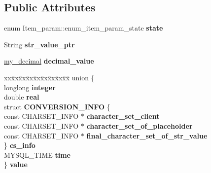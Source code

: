 \subsection*{Public Attributes}
\begin{DoxyCompactItemize}
\item 
\mbox{\label{classItem__param_a93ac83057ade937be25c4e548d0b9e8c}} 
enum Item\+\_\+param\+::enum\+\_\+item\+\_\+param\+\_\+state {\bfseries state}
\item 
\mbox{\label{classItem__param_a6a6116c2308a7beafdd60959c722fd63}} 
String {\bfseries str\+\_\+value\+\_\+ptr}
\item 
\mbox{\label{classItem__param_a6fb4d53f1a577c07d2eaa7b39b5d0c0c}} 
\mbox{\hyperlink{classmy__decimal}{my\+\_\+decimal}} {\bfseries decimal\+\_\+value}
\item 
\mbox{\label{classItem__param_afcce5c2dcb9263cc5cb619f0338fe6a7}} 
\begin{tabbing}
xx\=xx\=xx\=xx\=xx\=xx\=xx\=xx\=xx\=\kill
union \{\\
\>longlong {\bfseries integer}\\
\>double {\bfseries real}\\
\>struct {\bfseries CONVERSION\_INFO} \{\\
\>\>const CHARSET\_INFO $\ast$ {\bfseries character\_set\_client}\\
\>\>const CHARSET\_INFO $\ast$ {\bfseries character\_set\_of\_placeholder}\\
\>\>const CHARSET\_INFO $\ast$ {\bfseries final\_character\_set\_of\_str\_value}\\
\>\} {\bfseries cs\_info}\\
\>MYSQL\_TIME {\bfseries time}\\
\} {\bfseries value}\\


\end{tabbing}
\end{DoxyCompactItemize}
